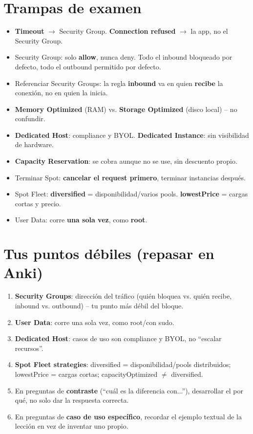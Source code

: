 \documentclass[11pt,a4paper]{article}
\let\oldsection\section
\renewcommand{\section}{\Needspace{9\baselineskip}\oldsection}
\begin{document}
\section{Trampas de examen}
\begin{itemize}
  \item \textbf{Timeout} $\rightarrow$ Security Group. \textbf{Connection refused} $\rightarrow$ la app, no el Security Group.
  \item Security Group: solo \textbf{allow}, nunca deny. Todo el inbound bloqueado por defecto, todo el outbound permitido por defecto.
  \item Referenciar Security Groups: la regla \textbf{inbound} va en quien \textbf{recibe} la conexión, no en quien la inicia.
  \item \textbf{Memory Optimized} (RAM) vs. \textbf{Storage Optimized} (disco local) -- no confundir.
  \item \textbf{Dedicated Host}: compliance y BYOL. \textbf{Dedicated Instance}: sin visibilidad de hardware.
  \item \textbf{Capacity Reservation}: se cobra aunque no se use, sin descuento propio.
  \item Terminar Spot: \textbf{cancelar el request primero}, terminar instancias después.
  \item Spot Fleet: \textbf{diversified} = disponibilidad/varios pools. \textbf{lowestPrice} = cargas cortas y precio.
  \item User Data: corre \textbf{una sola vez}, como \textbf{root}.
\end{itemize}

\section{Tus puntos débiles (repasar en Anki)}
\begin{enumerate}
  \item \textbf{Security Groups}: dirección del tráfico (quién bloquea vs. quién recibe, inbound vs. outbound) -- tu punto más débil del bloque.
  \item \textbf{User Data}: corre una sola vez, como root/con sudo.
  \item \textbf{Dedicated Host}: casos de uso son compliance y BYOL, no ``escalar recursos''.
  \item \textbf{Spot Fleet strategies}: diversified = disponibilidad/pools distribuidos; lowestPrice = cargas cortas; capacityOptimized $\neq$ diversified.
  \item En preguntas de \textbf{contraste} (``cuál es la diferencia con...''), desarrollar el por qué, no solo dar la respuesta correcta.
  \item En preguntas de \textbf{caso de uso específico}, recordar el ejemplo textual de la lección en vez de inventar uno propio.
\end{enumerate}
\end{document}
